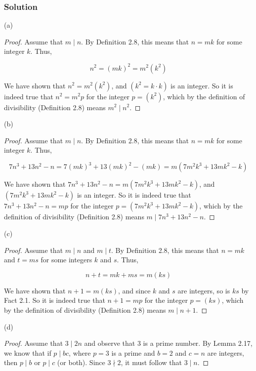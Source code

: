 \documentclass{article}
\begin{document}
\subsubsection*{Solution}

(a) 

\begin{proof}
    Assume that  $m \mid n$. By Definition 2.8, this means that $n=mk$ for some integer $k$.
    Thus,

    \[n^2=(mk)^2=m^2(k^2)\]

    We have shown that $n^2=m^2(k^2)$, and $(k^2=k\cdot k)$ is an integer. So it is indeed true that $n^2=m^2p$ for the integer $p=(k^2)$, which by the definition of divisibility (Definition 2.8) means $m^2 \mid n^2$.
\end{proof}

\noindent (b)

\begin{proof}
    Assume that  $m \mid n$. By Definition 2.8, this means that $n=mk$ for some integer $k$.
    Thus,

    \[7n^3+13n^2-n=7(mk)^3+13(mk)^2-(mk)=m(7m^2k^3+13mk^2-k)\]

    We have shown that $7n^3+13n^2-n=m(7m^2k^3+13mk^2-k)$, and ${(7m^2k^3+13mk^2-k)}$ is an integer. So it is indeed true that $7n^3+13n^2-n=mp$ for the integer $p=(7m^2k^3+13mk^2-k)$, which by the definition of divisibility (Definition 2.8) means $m \mid 7n^3+13n^2-n$.
\end{proof}

\noindent (c)

\begin{proof}
    Assume that  $m \mid n$ and $m \mid t$. By Definition 2.8, this means that $n=mk$ and $t=ms$ for some integers $k$ and $s$.
    Thus,

    \[n+t=mk+ms=m(ks)\]

    We have shown that $n+1=m(ks)$, and since $k$ and $s$ are integers, so is $ks$ by Fact 2.1. So it is indeed true that $n+1=mp$ for the integer $p=(ks)$, which by the definition of divisibility (Definition 2.8) means $m \mid n+1$.
\end{proof}

\newpage

\noindent (d) 

\begin{proof}
    Assume that $ 3 \mid 2n $ and observe that 3 is a prime number. By Lemma 2.17, we know that if $ p \mid bc $, where $ p = 3 $ is a prime and $ b = 2 $ and $ c = n $ are integers, then $ p \mid b $ or $ p \mid c $ (or both). Since $ 3 \nmid 2 $, it must follow that $ 3 \mid n $.
\end{proof}
\end{document}
